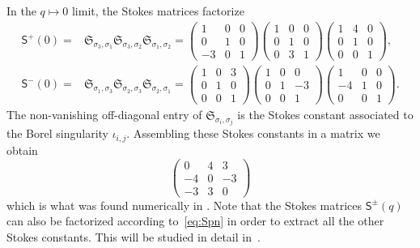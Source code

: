 \documentclass[12pt,reqno]{amsart}
\theoremstyle{definition}
\def\s{\sigma}
\def\-{\,-\,}
\def\mf{\mathfrak}
\def\ms{\mathsf}
\begin{document}
In the $q\mapsto 0$ limit, the Stokes matrices factorize
\begin{subequations}
\begin{align}
  \ms{S}^+(0) =
  &\mf{S}_{\s_3,\s_1}\mf{S}_{\s_3,\s_2}\mf{S}_{\s_1,\s_2}
    =
     \begin{pmatrix}
       1&0&0\\0&1&0\\-3&0&1
     \end{pmatrix}
     \begin{pmatrix}
       1&0&0\\0&1&0\\0&3&1
     \end{pmatrix}
     \begin{pmatrix}
      1&4&0\\0&1&0\\0&0&1
    \end{pmatrix},  \label{eq:S0pu052}\\
  \ms{S}^-(0) =
  &\mf{S}_{\s_1,\s_3}\mf{S}_{\s_2,\s_3}\mf{S}_{\s_2,\s_1}
    =
     \begin{pmatrix}
       1&0&3\\0&1&0\\0&0&1
     \end{pmatrix}
     \begin{pmatrix}
       1&0&0\\0&1&-3\\0&0&1
     \end{pmatrix}
     \begin{pmatrix}
      1&0&0\\-4&1&0\\0&0&1
    \end{pmatrix}. \label{eq:S0nu052}
\end{align}
\end{subequations}
The non-vanishing off-diagonal entry of $\mf{S}_{\s_i,\s_j}$ is the
Stokes constant associated to the Borel singularity $\iota_{i,j}$.
Assembling these Stokes constants in a matrix we obtain
\begin{equation}
  \begin{pmatrix}
    0&4&3\\
    -4&0&-3\\
    -3&3&0
  \end{pmatrix}
\end{equation}
which is what was found numerically in \cite[Sec.3.3]{GZ:kashaev}.
Note that the Stokes matrices $\ms{S}^{\pm}(q)$ can also be factorized
according to~\eqref{eq:Spn} in order to extract all the other Stokes
constants. This will be studied in detail in~\cite{GGM-peacock}.
\end{document}
